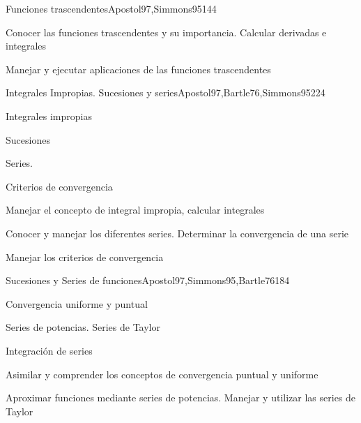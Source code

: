\begin{syllabus}
\begin{unit}{Funciones trascendentes}{Apostol97,Simmons95}{14}{4}
   \begin{learningoutcomes}
      \item Conocer las funciones trascendentes y su importancia. Calcular derivadas e integrales
      \item Manejar y ejecutar aplicaciones de las funciones trascendentes
      \end{learningoutcomes}
\end{unit}

\begin{unit}{Integrales Impropias. Sucesiones y series}{Apostol97,Bartle76,Simmons95}{22}{4}
   \begin{topics}
      \item Integrales impropias
      \item Sucesiones
      \item Series.
      \item Criterios de convergencia
   \end{topics}

   \begin{learningoutcomes}
      \item Manejar el concepto de integral impropia, calcular integrales
      \item Conocer y manejar los diferentes series. Determinar la convergencia de una serie
      \item Manejar los criterios de convergencia
      \end{learningoutcomes}
\end{unit}

\begin{unit}{Sucesiones y Series de funciones}{Apostol97,Simmons95,Bartle76}{18}{4}
   \begin{topics}
      \item Convergencia uniforme y puntual
      \item Series de potencias. Series de Taylor
      \item Integración de series
   \end{topics}

   \begin{learningoutcomes}
      \item Asimilar y comprender los conceptos de convergencia puntual y uniforme
      \item Aproximar funciones mediante series de potencias. Manejar y utilizar las series de Taylor
      \end{learningoutcomes}
\end{unit}


\end{syllabus}
